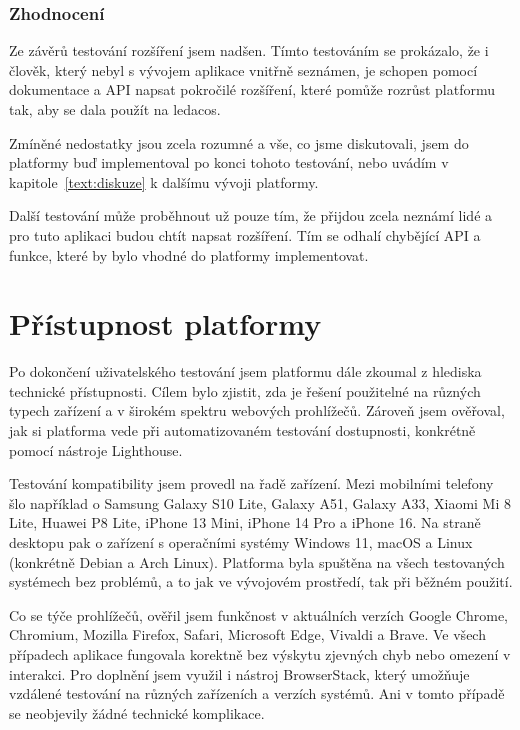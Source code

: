 \subsubsection{Zhodnocení}

Ze závěrů testování rozšíření jsem nadšen.
Tímto testováním se prokázalo, že i člověk, který nebyl s vývojem aplikace vnitřně seznámen, je schopen pomocí dokumentace a API napsat pokročilé rozšíření, které pomůže rozrůst platformu tak, aby se dala použít na ledacos.

Zmíněné nedostatky jsou zcela rozumné a vše, co jsme diskutovali, jsem do platformy buď implementoval po konci tohoto testování, nebo uvádím v kapitole~\ref{text:diskuze} k dalšímu vývoji platformy.

Další testování může proběhnout už pouze tím, že přijdou zcela neznámí lidé a pro tuto aplikaci budou chtít napsat rozšíření.
Tím se odhalí chybějící API a funkce, které by bylo vhodné do platformy implementovat.


\section{Přístupnost platformy}

Po dokončení uživatelského testování jsem platformu dále zkoumal z hlediska technické přístupnosti. 
Cílem bylo zjistit, zda je řešení použitelné na různých typech zařízení a v širokém spektru webových prohlížečů. 
Zároveň jsem ověřoval, jak si platforma vede při automatizovaném testování dostupnosti, konkrétně pomocí nástroje Lighthouse.

Testování kompatibility jsem provedl na řadě zařízení. 
Mezi mobilními telefony šlo například o Samsung Galaxy S10 Lite, Galaxy A51, Galaxy A33, Xiaomi Mi 8 Lite, Huawei P8 Lite, iPhone 13 Mini, iPhone 14 Pro a iPhone 16. 
Na straně desktopu pak o zařízení s operačními systémy Windows 11, macOS a Linux (konkrétně Debian a Arch Linux). 
Platforma byla spuštěna na všech testovaných systémech bez problémů, a to jak ve vývojovém prostředí, tak při běžném použití.

Co se týče prohlížečů, ověřil jsem funkčnost v aktuálních verzích Google Chrome, Chromium, Mozilla Firefox, Safari, Microsoft Edge, Vivaldi a Brave. 
Ve všech případech aplikace fungovala korektně bez výskytu zjevných chyb nebo omezení v interakci. 
Pro doplnění jsem využil i nástroj BrowserStack, který umožňuje vzdálené testování na různých zařízeních a verzích systémů. Ani v tomto případě se neobjevily žádné technické komplikace.

